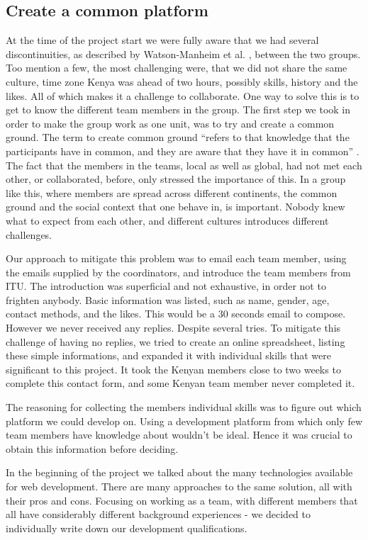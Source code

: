 \subsection{Create a common platform} \label{sec:commonplatform}
At the time of the project start we were fully aware that we had several discontinuities, as described by Watson-Manheim et al. \cite{watson2007distance}, between the two groups. Too mention a few, the most challenging were, that we did not share the same culture, time zone \textemdash Kenya was ahead of two hours\textemdash, possibly skills, history and the likes. All of which makes it a challenge to collaborate. One way to solve this is to get to know the different team members in the group. The first step we took in order to make the group work as one unit, was to try and create a common ground. The term to create common ground ``refers to that knowledge that the participants have in common, and they are aware that they have it in common'' \cite{olson:2000:distance}. The fact that the members in the teams, local as well as global, had not met each other, or collaborated, before, only stressed the importance of this. In a group like this, where members are spread across different continents, the common ground and the social context that one behave in, is important. Nobody knew what to expect from each other, and different cultures introduces different challenges. 

Our approach to mitigate this problem was to email each team member, using the emails supplied by the coordinators, and introduce the team members from ITU. The introduction was superficial and not exhaustive, in order not to frighten anybody. 
Basic information was listed, such as name, gender, age, contact methods, and the likes. This would be a 30 seconds email to compose. However we never received any replies. Despite several tries. To mitigate this challenge of having no replies, we tried to create an online spreadsheet, listing these simple informations, and expanded it with individual skills that were significant to this project.
It took the Kenyan members close to two weeks to complete this contact form, and some Kenyan team member never completed it.

The reasoning for collecting the members individual skills was to figure out which platform we could develop on. Using a development platform from which only few team members have knowledge about wouldn't be ideal. Hence it was crucial to obtain this information before deciding.

In the beginning of the project we talked about the many technologies available for web development. There are many approaches to the same solution, all with their pros and cons. Focusing on working as a team, with different members that all have considerably different background experiences - we decided to individually write down our development qualifications.

